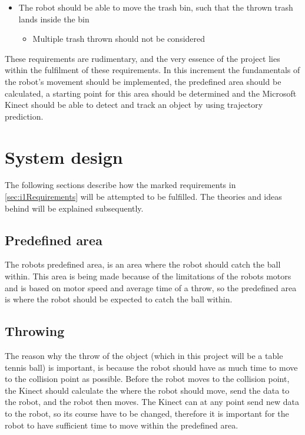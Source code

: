 \begin{itemize}
\begin{itemize}
\end{itemize}
\item The robot should be able to move the trash bin, such that the thrown trash lands inside the bin
\begin{itemize}
\item Multiple trash thrown should not be considered
\end{itemize}
\end{itemize}

These requirements are rudimentary, and the very essence of the project lies within the fulfilment of these requirements. In this increment the fundamentals of the robot’s movement should be implemented, the predefined area should be calculated, a starting point for this area should be determined and the Microsoft Kinect should be able to detect and track an object by using trajectory prediction.

\section{System design}
\label{sec:i1System Design}
The following sections describe how the marked requirements in \ref{sec:i1Requirements} will be attempted to be fulfilled. The theories and ideas behind will be explained subsequently.

\subsection{Predefined area}
\label{sec:i1Predefined area}
The robots predefined area, is an area where the robot should catch the ball within. This area is being made because of the limitations of the robots motors and is based on motor speed and average time of a throw, so the predefined area is where the robot should be expected to catch the ball within.

\subsection{Throwing}
\label{sec:i1Throwing}
The reason why the throw of the object (which in this project will be a table tennis ball) is important, is because the robot should have as much time to move to the collision point as possible. Before the robot moves to the collision point, the Kinect should calculate the where the robot should move, send the data to the robot, and the robot then moves. The Kinect can at any point send new data to the robot, so its course have to be changed, therefore it is important for the robot to have sufficient time to move within the predefined area.    

